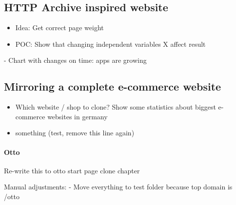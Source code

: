 \subsection{HTTP Archive inspired website}

\begin{itemize}
    \item Idea: Get correct page weight
    \item POC: Show that changing independent variables X affect result
\end{itemize}



- Chart with changes on time: apps are growing









\subsection{Mirroring a complete e-commerce website}

\begin{itemize}
\item Which website / shop to clone? Show some statistics about biggest e-commerce websites in germany
\item something (test, remove this line again)
\end{itemize}

\paragraph{Otto}

Re-write this to otto start page clone chapter

Manual adjustments:
- Move everything to test folder because top domain is /otto

